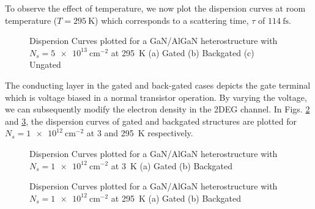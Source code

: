 To observe the effect of temperature, we now plot the dispersion curves at room temperature ($T = \SI{295}{\kelvin}$) which corresponds to a scattering time, $\tau$ of $\SI{114}{\fs}$.
\begin{figure}[!htbp]
  \centering
   \hfil
  \caption{Dispersion Curves plotted for a GaN/AlGaN heterostructure with $N_s = \SI{5e13}{\cm^{-2}}$ at \SI{295}{\kelvin} (a) Gated (b) Backgated (c) Ungated}
  \label{fig:dispersion_hif_hiT}
\end{figure}
%

The conducting layer in the gated and back-gated cases depicts the gate terminal which is voltage biased in a normal transistor operation. By varying the voltage, we can subsequently modify the electron density in the 2DEG channel. In Figs. \ref{fig:dispersion_lof_lowT} and \ref{fig:dispersion_lof_hiT}, the dispersion curves of gated and backgated structures are plotted for $N_s = \SI{1e12}{\cm^{-2}}$ at \SI{3}{} and \SI{295}{\kelvin} respectively.
\begin{figure}[!htbp]
  \begin{center}
  \caption{Dispersion Curves plotted for a GaN/AlGaN heterostructure with $N_s = \SI{1e12}{\cm^{-2}}$ at \SI{3}{\kelvin} (a) Gated (b) Backgated}
  \label{fig:dispersion_lof_lowT}
  \end{center}
\end{figure}
%

\begin{figure}[!htbp]
  \begin{center}
  \caption{Dispersion Curves plotted for a GaN/AlGaN heterostructure with $N_s = \SI{1e12}{\cm^{-2}}$ at \SI{295}{\kelvin} (a) Gated (b) Backgated}
  \label{fig:dispersion_lof_hiT}
  \end{center}
\end{figure}

